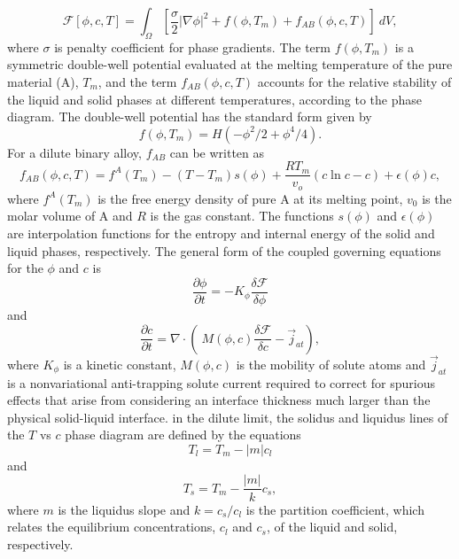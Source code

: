 \documentclass[10pt]{article}
\begin{document}
\begin{equation}
\mathcal{F}[\phi,c,T]= \int_{\Omega}  \left[\frac{\sigma}{2}|\nabla \phi|^2 +f(\phi, T_m) +  f_{AB}(\phi, c, T) \right]  ~dV,
\end{equation}
where $\sigma$ is penalty coefficient for phase gradients. The term $f(\phi, T_m)$ is a symmetric double-well potential evaluated at the melting temperature of the pure material (A), $T_m$, and  the term $f_{AB}(\phi, c, T)$ accounts for the relative stability of the liquid and solid phases at different temperatures, according to the phase diagram. The double-well potential has the standard form given by
\begin{equation}
f(\phi, T_m) = H(-\phi^2/2 + \phi^4/4).
\end{equation}
For a dilute binary alloy, $f_{AB}$ can be written as
\begin{equation}
f_{AB}(\phi, c, T) = f^A(T_m) - (T-T_m) s(\phi) +  \frac{R T_m}{v_o}(c\ln c -c) +\epsilon (\phi) c,
\end{equation}
where $f^A(T_m)$ is the free energy density of pure A at its melting point, $v_0$ is the molar volume of A and $R$ is the gas constant. The functions $s(\phi)$ and $\epsilon (\phi)$ are interpolation functions for the entropy and internal energy of the solid and liquid phases, respectively. The general form of the coupled governing equations for the $\phi$ and $c$ is
\begin{equation}
\frac{\partial \phi}{\partial t} = -K_\phi \frac{\delta \mathcal{F}}{\delta \phi}
\end{equation}
and
\begin{equation}
\frac{\partial c}{\partial t} = \nabla \cdot \left(\  M(\phi,c) \frac{\delta \mathcal{F}}{\delta c}  - \vec{j}_{at} \right), 
\end{equation}
where $K_\phi$ is a kinetic constant, $M(\phi,c)$ is the mobility of solute atoms and $\vec{j}_{at}$ is a nonvariational anti-trapping solute current required to correct for spurious effects that arise from considering an interface thickness much larger than the physical solid-liquid interface. in the dilute limit, the solidus and liquidus lines of the $T$ vs $c$ phase diagram are defined by the equations
\begin{equation}
T_l=T_m-|m|c_l
\end{equation}
and
\begin{equation}
T_s=T_m-\frac{|m|}{k}c_s,
\end{equation}
where $m$ is the liquidus slope and $k=c_s/c_l$ is the partition coefficient, which relates the equilibrium concentrations, $c_l$ and $c_s$, of the liquid and solid, respectively.\\
\end{document}
